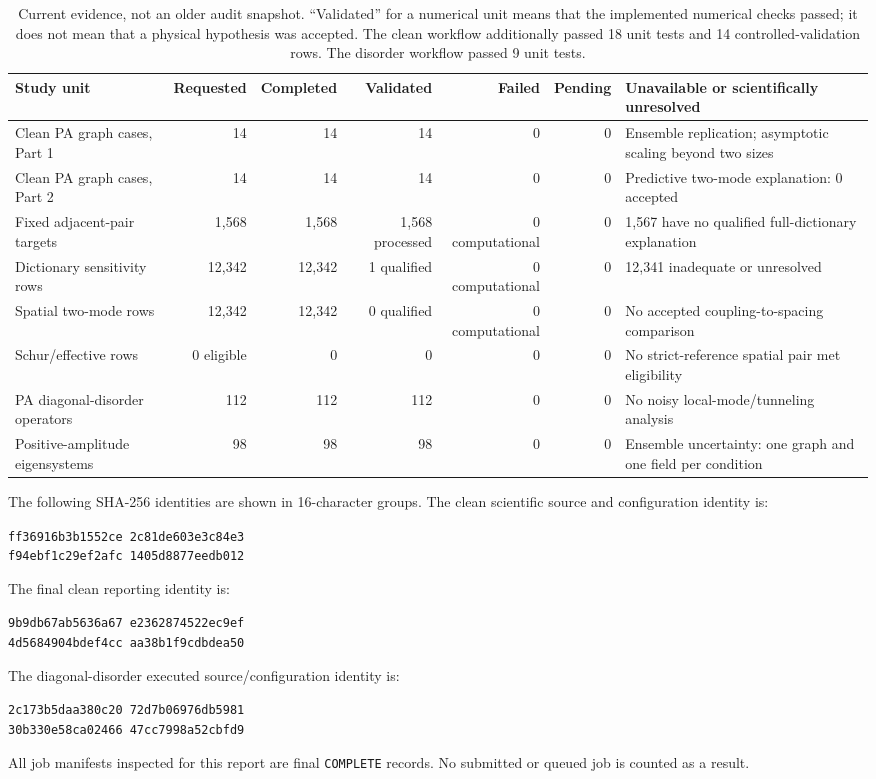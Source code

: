 \documentclass[11pt]{article}
\newcommand{\code}[1]{\texttt{#1}}
\begin{document}
\begin{table}[H]
\centering
\small
\begin{tabularx}{\textwidth}{@{}YrrrrrY@{}}
\toprule
Study unit & Requested & Completed & Validated & Failed & Pending & Unavailable or scientifically unresolved \\
\midrule
Clean PA graph cases, Part 1 & 14 & 14 & 14 & 0 & 0 & Ensemble replication; asymptotic scaling beyond two sizes \\
Clean PA graph cases, Part 2 & 14 & 14 & 14 & 0 & 0 & Predictive two-mode explanation: 0 accepted \\
Fixed adjacent-pair targets & 1,568 & 1,568 & 1,568 processed & 0 computational & 0 & 1,567 have no qualified full-dictionary explanation \\
Dictionary sensitivity rows & 12,342 & 12,342 & 1 qualified & 0 computational & 0 & 12,341 inadequate or unresolved \\
Spatial two-mode rows & 12,342 & 12,342 & 0 qualified & 0 computational & 0 & No accepted coupling-to-spacing comparison \\
Schur/effective rows & 0 eligible & 0 & 0 & 0 & 0 & No strict-reference spatial pair met eligibility \\
PA diagonal-disorder operators & 112 & 112 & 112 & 0 & 0 & No noisy local-mode/tunneling analysis \\
Positive-amplitude eigensystems & 98 & 98 & 98 & 0 & 0 & Ensemble uncertainty: one graph and one field per condition \\
\bottomrule
\end{tabularx}
\caption{Current evidence, not an older audit snapshot.  ``Validated'' for a numerical unit means that the implemented numerical checks passed; it does not mean that a physical hypothesis was accepted.  The clean workflow additionally passed 18 unit tests and 14 controlled-validation rows.  The disorder workflow passed 9 unit tests.}
\label{tab:coverage}
\end{table}

The following SHA-256 identities are shown in 16-character groups.  The clean scientific source and configuration identity is:
\begin{center}\small\texttt{ff36916b3b1552ce 2c81de603e3c84e3}\\
\texttt{f94ebf1c29ef2afc 1405d8877eedb012}\end{center}
The final clean reporting identity is:
\begin{center}\small\texttt{9b9db67ab5636a67 e2362874522ec9ef}\\
\texttt{4d5684904bdef4cc aa38b1f9cdbdea50}\end{center}
The diagonal-disorder executed source/configuration identity is:
\begin{center}\small\texttt{2c173b5daa380c20 72d7b06976db5981}\\
\texttt{30b330e58ca02466 47cc7998a52cbfd9}\end{center}
All job manifests inspected for this report are final \code{COMPLETE} records.  No submitted or queued job is counted as a result.
\end{document}
